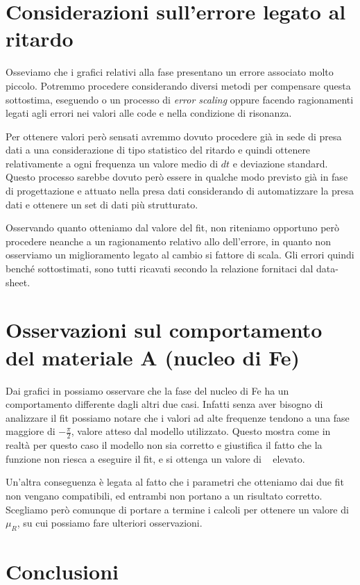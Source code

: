 \documentclass[
    prl,
    floatfix,
    reprint, 
    superscriptaddress, 
    altaffilletter, 
    amsmath, 
    amssymb, 
    a4paper]{revtex4-2}
\begin{document}
\section*{Considerazioni sull'errore legato al ritardo}
Osseviamo che i grafici relativi alla fase presentano un errore associato molto piccolo. Potremmo procedere considerando diversi metodi per compensare questa sottostima, eseguendo o un processo di \textit{error scaling} oppure facendo ragionamenti legati agli errori nei valori alle code e nella condizione di risonanza. 

Per ottenere valori però sensati avremmo dovuto procedere già in sede di presa dati a una considerazione di tipo statistico del ritardo e quindi ottenere relativamente a ogni frequenza un valore medio di $dt$ e deviazione standard. Questo processo sarebbe dovuto però essere in qualche modo previsto già in fase di progettazione e attuato nella presa dati considerando di automatizzare la presa dati e ottenere un set di dati più strutturato. 

Osservando quanto otteniamo dal valore del fit, non riteniamo opportuno però procedere neanche a un ragionamento relativo allo  dell'errore, in quanto non osserviamo un miglioramento legato al cambio si fattore di scala. Gli errori quindi benché sottostimati, sono tutti ricavati secondo la relazione fornitaci dal data-sheet.


\section*{Osservazioni sul comportamento del materiale A (nucleo di F\lowercase{e})}
Dai grafici in  possiamo osservare che la fase del nucleo di Fe ha un comportamento differente dagli altri due casi. Infatti senza aver bisogno di analizzare il fit possiamo notare che i valori ad alte frequenze tendono a una fase maggiore di $-\frac{\pi}{2}$, valore atteso dal modello utilizzato. Questo mostra come in realtà per questo caso il modello non sia corretto e giustifica il fatto che la funzione non riesca a eseguire il fit, e si ottenga un valore di \ChiNdf~ elevato. 

Un'altra conseguenza è legata al fatto che i parametri che otteniamo dai due fit non vengano compatibili, ed entrambi non portano a un risultato corretto. Scegliamo però comunque di portare a termine i calcoli per ottenere un valore di $\mu_R$, su cui possiamo fare ulteriori osservazioni. 


\section*{Conclusioni}
\end{document}
